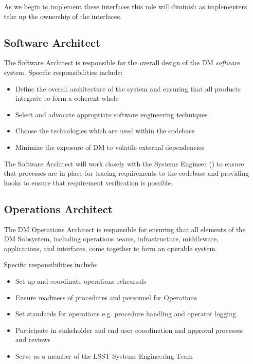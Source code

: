 As we begin to implement these interfaces this role will diminish as implementers take up the ownership of the interfaces.

\subsection{Software Architect \label{role:softarc}}

The Software Architect is responsible for the overall design of the \gls{DM} \textit{software} system. Specific responsibilities include:

\begin{itemize}

\item{Define the overall architecture of the system and ensuring that all products integrate to form a coherent whole}
\item{Select and advocate appropriate software engineering techniques}
\item{Choose the technologies which are used within the codebase}
\item{Minimize the exposure of \gls{DM} to volatile external dependencies}

\end{itemize}

The Software Architect will work closely with the \gls{Systems Engineer} () to ensure that processes are in place for tracing requirements to the codebase and providing hooks to ensure that requirement verification is possible.

\subsection{Operations Architect \label{role:opsarc}}

The \gls{DM} \gls{Operations} Architect is responsible for ensuring that all elements of the \gls{DM} \gls{Subsystem}, including operations teams, infrastructure, middleware, applications, and interfaces,
come together to form an operable system.

Specific responsibilities include:

\begin{itemize}
\item Set up and coordinate operations rehearsals
\item Ensure readiness of procedures and personnel for \gls{Operations}
\item Set standards for operations e.g. procedure handling and operator logging
\item Participate in stakeholder and end user coordination and approval processes and reviews
\item Serve as a member of the \gls{LSST} \gls{Systems Engineering} Team
\end{itemize}

